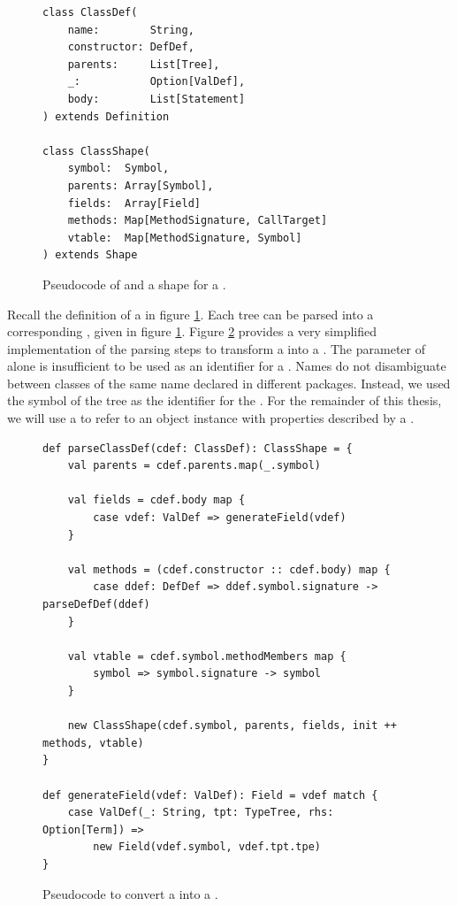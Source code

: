 \begin{figure}[!htb]
\centering
\begin{verbatim}
class ClassDef(
	name:        String,
	constructor: DefDef, 
	parents:     List[Tree], 
	_:           Option[ValDef], 
	body:        List[Statement]
) extends Definition

class ClassShape(
	symbol:  Symbol,
	parents: Array[Symbol],
	fields:  Array[Field]
	methods: Map[MethodSignature, CallTarget]
	vtable:  Map[MethodSignature, Symbol]
) extends Shape
\end{verbatim}
\label{impl:classshape}
\caption{Pseudocode of  and a shape for a .}
\end{figure}

Recall the definition of a  in figure \ref{impl:classshape}.
Each  tree can be parsed into a corresponding , given in figure \ref{impl:classshape}.
Figure \ref{impl:parse-classdef} provides a very simplified implementation of the parsing steps to transform a  into a .
The  parameter of  alone is insufficient to be used as an identifier for a .
Names do not disambiguate between classes of the same name declared in different packages.
Instead, we used the symbol of the  tree as the identifier for the .
For the remainder of this thesis, we will use a  to refer to an object instance with properties described by a .

\begin{figure}[!htb]
\begin{verbatim}
def parseClassDef(cdef: ClassDef): ClassShape = {
	val parents = cdef.parents.map(_.symbol)
	
	val fields = cdef.body map {
		case vdef: ValDef => generateField(vdef)	
	}
	
	val methods = (cdef.constructor :: cdef.body) map {
		case ddef: DefDef => ddef.symbol.signature -> parseDefDef(ddef)
	}
	
	val vtable = cdef.symbol.methodMembers map {
		symbol => symbol.signature -> symbol
	}

	new ClassShape(cdef.symbol, parents, fields, init ++ methods, vtable)
}

def generateField(vdef: ValDef): Field = vdef match {
	case ValDef(_: String, tpt: TypeTree, rhs: Option[Term]) => 
		new Field(vdef.symbol, vdef.tpt.tpe)
}
\end{verbatim}
\caption{Pseudocode to convert a  into a .}
\label{impl:parse-classdef}
\end{figure}

